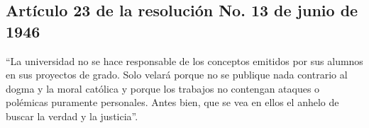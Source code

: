 \newpage
\begin{center}
\section*{Artículo 23 de la resolución No. 13 de junio de 1946}
\end{center}

“La universidad no se hace responsable de los conceptos emitidos por sus alumnos en sus proyectos de grado. Solo velará porque no se publique nada contrario al dogma y la moral católica y porque los trabajos no contengan ataques o polémicas puramente personales. Antes bien, que se vea en ellos el anhelo de buscar la verdad y la justicia”.